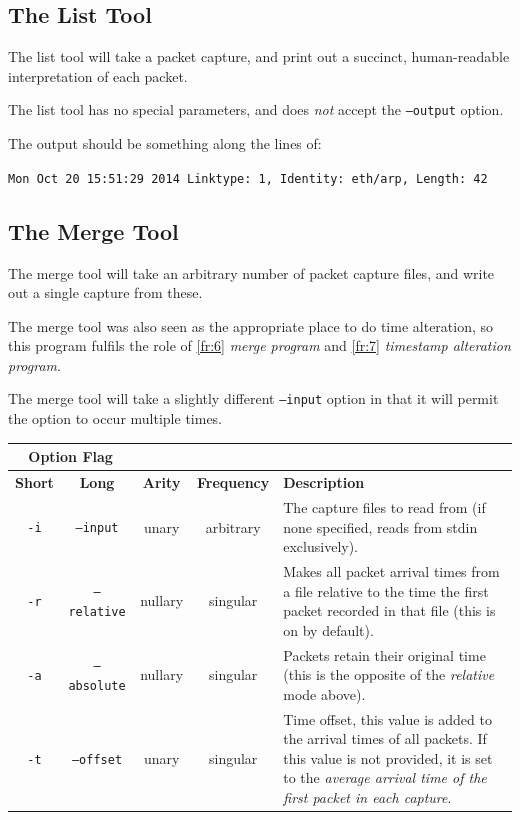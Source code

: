 \documentclass[10pt,a4paper,notitlepage]{report}
\begin{document}
\subsection{The List Tool}
\label{sec:listdes}
The list tool will take a packet capture, and print out a succinct, human-readable interpretation of each packet.

The list tool has no special parameters, and does \emph{not} accept the \texttt{--output} option.

The output should be something along the lines of:

{\small\texttt{Mon Oct 20 15:51:29 2014 Linktype: 1, Identity: eth/arp, Length: 42}}

\subsection{The Merge Tool}
\label{sec:mergedes}
The merge tool will take an arbitrary number of packet capture files, and write out a single capture from these.

The merge tool was also seen as the appropriate place to do time alteration, so this program fulfils the role of \ref{fr:6} \emph{merge program} and \ref{fr:7} \emph{timestamp alteration program}.

The merge tool will take a slightly different \texttt{--input} option in that it will permit the option to occur multiple times.

\begin{tabularx}{\textwidth}{|c|c|c|c|X|}
\cline{1-2}
\multicolumn{2}{|c|}{\textbf{Option Flag}} & \multicolumn{3}{c}{}\\ \hline
\textbf{Short} & \textbf{Long} & \textbf{Arity} & \textbf{Frequency} & \textbf{Description} \\ \hline
\texttt{-i} & \texttt{--input} & unary & arbitrary & The capture files to read from (if none specified, reads from stdin exclusively).\\ \hline
\texttt{-r} & \texttt{--relative} & nullary & singular & Makes all packet arrival times from a file relative to the time the first packet recorded in that file (this is on by default).\\ \hline
\texttt{-a} & \texttt{--absolute} & nullary & singular & Packets retain their original time (this is the opposite of the \emph{relative} mode above).\\ \hline
\texttt{-t} & \texttt{--offset} & unary & singular & Time offset, this value is added to the arrival times of all packets. If this value is not provided, it is set to the \emph{average arrival time of the first packet in each capture}. \\ \hline
\end{tabularx}
\end{document}
